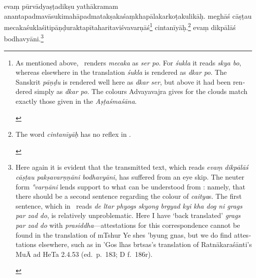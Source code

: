 \documentclass[naipra.tex]{subfiles}
\begin{document}
\begin{sanskrit}

\pstart
evaṃ pūrvādyaṣṭadikṣu yathākramam ananta\dsh padma\dsh vāsuki\dsh mahāpadma\dsh takṣaka\dsh śaṃkhapāla\dsh karkoṭa\dsh kulikāḥ.
meghāś cāṣṭau mecaka\dsh śukla\dsh śiti\dsh pāṇḍu\dsh rakta\dsh pīta\dsh harita\dsh viśvavarṇāś\footnote{
	\begin{english}%
		As mentioned above, \TIB\ renders \emph{mecaka} as \emph{ser po}.
		For \emph{śukla} it reads \emph{skya bo}, whereas elsewhere in the translation \emph{śukla} is rendered as \emph{dkar po}.
		The Sanskrit \emph{pāṇḍu} is rendered well here as \emph{dkar ser}, but above it had been rendered simply as \emph{dkar po}.
		The colours Advayavajra gives for the clouds match exactly those given in the \emph{Aṣṭaśmaśāna}.
	\end{english}
} cintanīyāḥ.\footnote{\begin{english}
	The word \emph{cintanīyāḥ} has no reflex in \TIB .
\end{english}}
evaṃ dikpālāś  bodhavyāni.\footnote{\begin{english}
	Here again it is evident that the transmitted text, which reads \emph{evaṃ dikpālāś cāṣṭau pakṣavarṇṇāni bodhavyāni}, has suffered from an eye skip.
	The neuter form \emph{°varṇāni} lends support to what can be understood from \TIB : namely, that there should be a second sentence regarding the colour of \emph{caitya}s.
	The first sentence, which in \TIB\ reads \emph{de ltar phyogs skyong brgyad kyi kha dog ni grags par zad do}, is relatively unproblematic.
	Here I have `back translated' \emph{grags par zad do} with \emph{prasiddha}—attestations for this correspondence cannot be found in the translation of mTshur Ye shes 'byung gnas, but we do find attestations elsewhere, such as in 'Gos lhas brtsas's translation of Ratnākaraśānti's MuĀ ad HeTa 2.4.53 (ed.\ p.\ 183; D f.\ 186r).


\end{english}}
\end{sanskrit}
\end{document}
